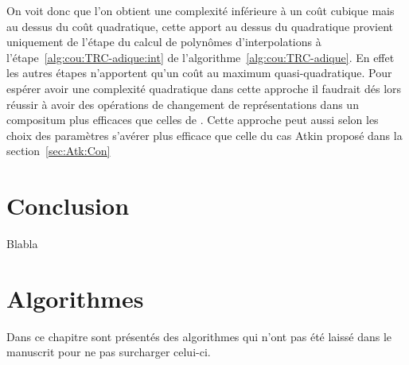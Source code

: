 \documentclass[10pt,a4paper]{book}
\theoremstyle{plain}
\theoremstyle{definition}
\theoremstyle{definition}
\theoremstyle{definition}
\theoremstyle{definition}
\theoremstyle{remark}
\theoremstyle{remark}
\theoremstyle{definition}
\begin{document}
On voit donc que l'on obtient une complexité inférieure à un coût cubique mais 
au dessus du coût quadratique, cette apport au dessus du quadratique provient
uniquement de l'étape du calcul de polynômes d'interpolations à 
l'étape~\ref{alg:cou:TRC-adique:int} de l'algorithme~\ref{alg:cou:TRC-adique}. 
En effet les autres étapes n'apportent qu'un coût au maximum quasi-quadratique. 
Pour espérer avoir une complexité quadratique dans cette approche il faudrait 
dés lors réussir à avoir des opérations de changement de représentations dans 
un compositum plus efficaces que celles de \cite{DeFeoDoliskaniSchost14}. Cette
approche peut aussi selon les choix des paramètres s'avérer plus efficace que
celle du cas Atkin proposé dans la section~\ref{sec:Atk:Con}

\chapter{Conclusion}
Blabla 




\appendix
\chapter{Algorithmes}
\label{cha:alg}
Dans ce chapitre sont présentés des algorithmes qui n'ont pas été laissé dans le manuscrit pour ne pas surcharger celui-ci.
\end{document}
